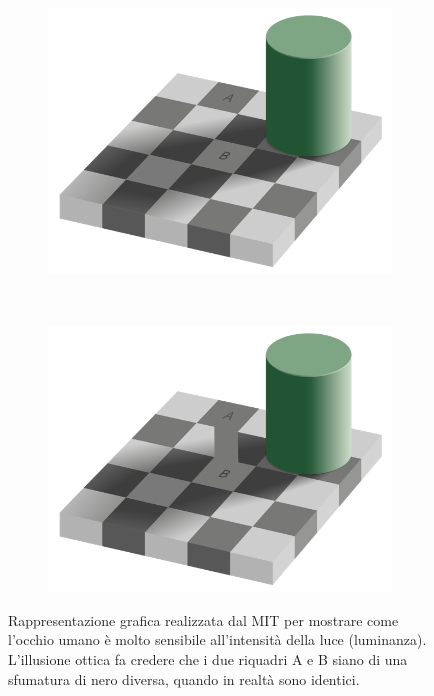 
\begin{figure}[htbp]
	\centering
	
	\begin{subfigure}[t]{0.45\textwidth}
		\centering
		\includegraphics[width=\textwidth]{res/mit1.png}
	\end{subfigure}%
	~ 
	\begin{subfigure}[t]{0.45\textwidth}
		\centering
		\includegraphics[width=\textwidth]{res/mit2.png}
	\end{subfigure}
	
	\caption{Rappresentazione grafica realizzata dal MIT\protect\footnotemark{} per mostrare come l'occhio umano è molto sensibile all'intensità della luce (luminanza). L'illusione ottica fa credere che i due riquadri A e B siano di una sfumatura di nero diversa, quando in realtà sono identici.}
	\label{fig:diff_mit}
\end{figure}

